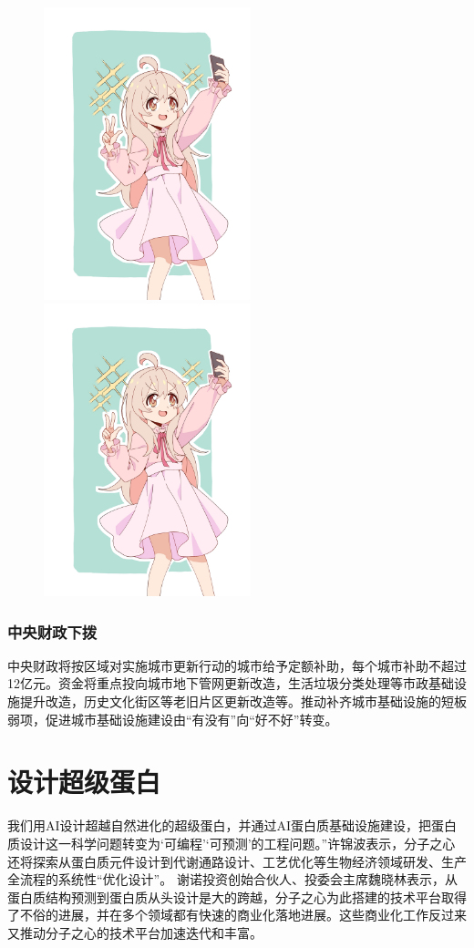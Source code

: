 \begin{figure}[htbp!]
	\centering
	\includegraphics[width=6cm]{图片/sample.jpg}
	\qquad
	\includegraphics[width=6cm]{图片/sample.jpg}
\end{figure}

\subsubsection{中央财政下拨}
中央财政将按区域对实施城市更新行动的城市给予定额补助，每个城市补助不超过12亿元。资金将重点投向城市地下管网更新改造，生活垃圾分类处理等市政基础设施提升改造，历史文化街区等老旧片区更新改造等。推动补齐城市基础设施的短板弱项，促进城市基础设施建设由“有没有”向“好不好”转变\cite{caimin2006,Peebles2001-100-100,Alice13}。

\section{设计超级蛋白}
我们用AI设计超越自然进化的超级蛋白，并通过AI蛋白质基础设施建设，把蛋白质设计这一科学问题转变为‘可编程’‘可预测’的工程问题。”许锦波表示，分子之心还将探索从蛋白质元件设计到代谢通路设计\cite{jin1993}、工艺优化等生物经济领域研发、生产全流程的系统性``优化设计''。
谢诺投资创始合伙人、投委会主席魏晓林表示，从蛋白质结构预测到蛋白质从头设计是大的跨越，分子之心为此搭建的技术平台取得了不俗的进展，并在多个领域都有快速的商业化落地进展。这些商业化工作反过来又推动分子之心的技术平台加速迭代和丰富\cite{gill1985}。

